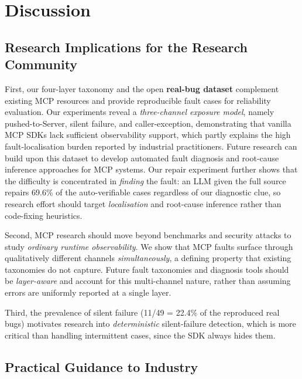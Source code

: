 
\section{Discussion}\label{sec:discussion}

\subsection{Research Implications for the Research Community}

First, our four-layer taxonomy and the open \textbf{real-bug dataset} complement existing MCP
resources and provide reproducible fault cases for reliability evaluation. Our experiments
reveal a \emph{three-channel exposure model}, namely pushed-to-Server, silent failure,
and caller-exception, demonstrating that vanilla MCP SDKs lack sufficient observability
support, which partly explains the high fault-localisation burden reported by industrial
practitioners. Future research can build upon this dataset to develop automated fault
diagnosis and root-cause inference approaches for MCP systems. Our repair experiment further
shows that the difficulty is concentrated in \emph{finding} the fault: an LLM given the full
source repairs 69.6\% of the auto-verifiable cases regardless of our diagnostic clue, so research
effort should target \emph{localisation} and root-cause inference rather than code-fixing
heuristics.

Second, MCP research should move beyond benchmarks and security attacks to study
\emph{ordinary runtime observability}. We show that MCP faults surface through qualitatively
different channels \emph{simultaneously}, a defining property that existing taxonomies do not
capture. Future fault taxonomies and diagnosis tools should be \emph{layer-aware} and account
for this multi-channel nature, rather than assuming errors are uniformly reported at a single
layer.

Third, the prevalence of silent failure (11/49 = 22.4\% of the reproduced real bugs)
motivates research into \emph{deterministic} silent-failure detection, which is more critical
than handling intermittent cases, since the SDK always hides them.

\subsection{Practical Guidance to Industry}

